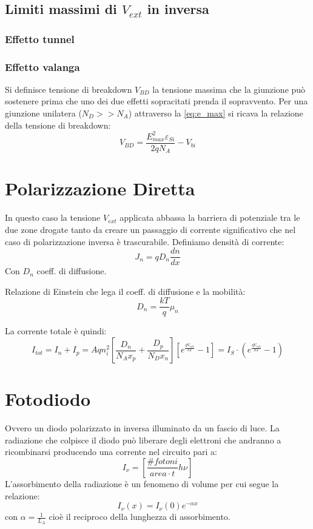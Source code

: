\documentclass{article}
\begin{document}
\subsection*{Limiti massimi di $V_{ext}$ in inversa}
\subsubsection*{Effetto tunnel}
\subsubsection*{Effetto valanga}
Si definisce tensione di breakdown $V_{BD}$ la tensione massima che la giunzione può sostenere prima che uno dei due effetti sopracitati prenda il sopravvento.
Per una giunzione unilatera ($N_D>>N_A$) attraverso la \eqref{eq:e_max} si ricava la relazione della tensione di breakdown:
\begin{equation*}
V_{BD} = \frac{E_{max}^2 \varepsilon_{Si}}{2qN_A} - V_{bi}
\end{equation*}

\section*{Polarizzazione Diretta}
In questo caso la tensione $V_{ext}$ applicata abbassa la barriera di potenziale tra le due zone drogate tanto da creare un passaggio di corrente significativo che nel caso di polarizzazione inversa è trascurabile.
Definiamo densità di corrente:
\begin{equation*}
J_n = qD_n \frac{dn}{dx}
\end{equation*}
Con $D_n$ coeff. di diffusione.

Relazione di Einstein che lega il coeff. di diffusione e la mobilità:
\begin{equation*}
D_n = \frac{kT}{q} \mu_n
\end{equation*}

La corrente totale è quindi:
\begin{equation*}
I_{tot} = I_n + I_p = Aqn_i^2[\frac{D_n}{N_Ax_p} + \frac{D_p}{N_Dx_n}][e^\frac{qV_{ext}}{kT}-1] = I_S \cdot (e^\frac{qV_{ext}}{kT}-1)
\end{equation*}

\section*{Fotodiodo}
Ovvero un diodo polarizzato in inversa illuminato da un fascio di luce.
La radiazione che colpisce il diodo può liberare degli elettroni che andranno a ricombinarsi producendo una corrente nel circuito pari a:
\begin{equation*}
I_\nu = [\frac{\#fotoni}{area \cdot t} h\nu]
\end{equation*}
L'assorbimento della radiazione è un fenomeno di volume per cui segue la relazione:
\begin{equation*}
I_\nu(x) = I_\nu(0) e^{-\alpha x}
\end{equation*}
con $\alpha = \frac{1}{L_A}$ cioè il reciproco della lunghezza di assorbimento.
\end{document}
